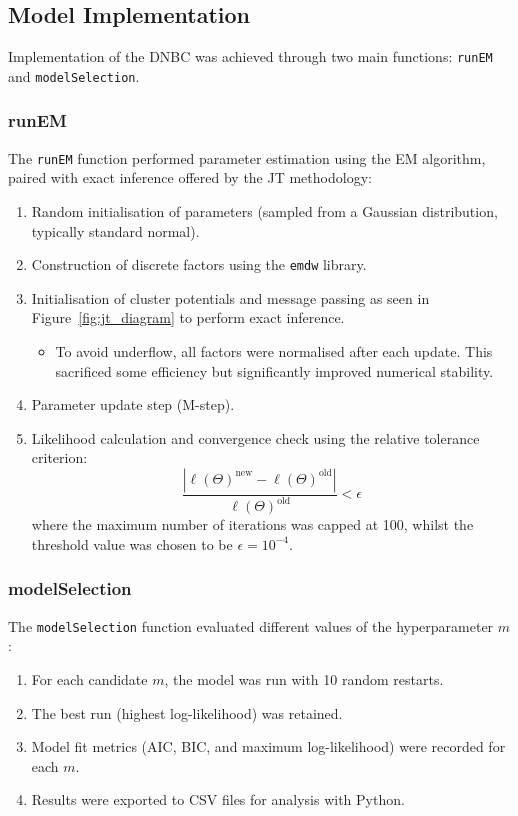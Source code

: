 \subsection{Model Implementation}
Implementation of the DNBC was achieved through two main functions: \texttt{runEM} and \texttt{modelSelection}.

\subsubsection*{runEM}
The \texttt{runEM} function performed parameter estimation using the EM algorithm, paired with exact inference offered by the JT methodology:
\begin{enumerate}
    \item Random initialisation of parameters (sampled from a Gaussian distribution, typically standard normal).
    \item Construction of discrete factors using the \texttt{emdw} library.
    \item Initialisation of cluster potentials and message passing as seen in Figure~\ref{fig:jt_diagram} to perform exact inference.
          \begin{itemize}
              \item To avoid underflow, all factors were normalised after each update. This sacrificed some efficiency but significantly improved numerical stability.
          \end{itemize}
    \item Parameter update step (M-step).
    \item Likelihood calculation and convergence check using the relative tolerance criterion:
    \[
        \frac{|\ell(\Theta)^{\text{new}} - \ell(\Theta)^{\text{old}}|}{\ell(\Theta)^{\text{old}}} < \epsilon
    \]
        where the maximum number of iterations was capped at 100, whilst the threshold value was chosen to be $\epsilon = 10^{-4}$.
\end{enumerate}

\subsubsection*{modelSelection}
The \texttt{modelSelection} function evaluated different values of the hyperparameter $m$:
\begin{enumerate}
    \item For each candidate $m$, the model was run with 10 random restarts.
    \item The best run (highest log-likelihood) was retained.
    \item Model fit metrics (AIC, BIC, and maximum log-likelihood) were recorded for each $m$.
    \item Results were exported to CSV files for analysis with Python.
\end{enumerate}

